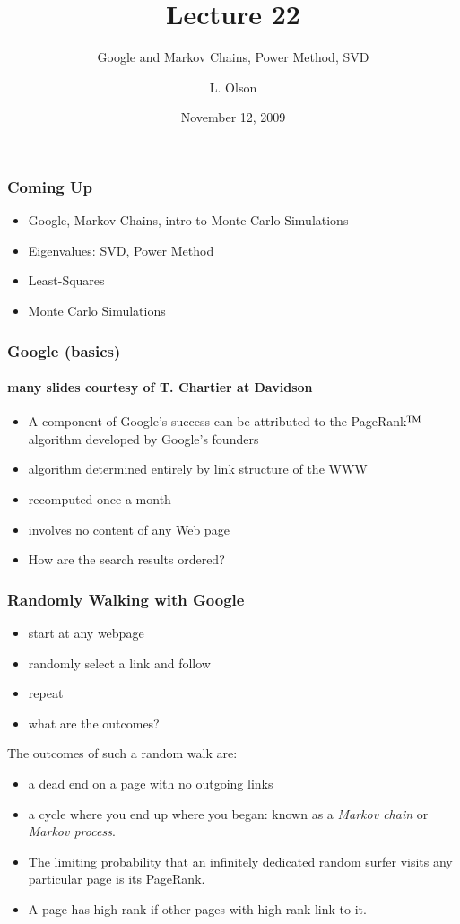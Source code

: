 \documentclass[10pt]{beamer}
\author{L. Olson}
\institute[UIUC]
{Department of Computer Science\\
University of Illinois at Urbana-Champaign\\
\vspace{0.5cm}
}
\title[CS 357]{Lecture 22}
\subtitle{Google and Markov Chains, Power Method, SVD}
\date{November 12, 2009}
\begin{document}
\begin{frame}
  \titlepage
\end{frame}
\begin{frame}
\frametitle{Coming Up}
  \begin{itemize}
    \item Google, Markov Chains, intro to Monte Carlo Simulations
    \item Eigenvalues: SVD, Power Method
    \item Least-Squares
    \item Monte Carlo Simulations
  \end{itemize}
\end{frame}
\begin{frame}
\frametitle{Google (basics)}
\framesubtitle{many slides courtesy of T. Chartier at Davidson}
\begin{itemize}
  \item A component of Google's success can be
attributed to the PageRank$^{\rm TM}$ algorithm developed by
Google's founders
  \item  algorithm determined entirely by link structure of the WWW
  \item recomputed once a month
  \item involves no content of any Web page
  \item How are the search results ordered?
\end{itemize}
\end{frame}
\begin{frame}
\frametitle{Randomly Walking with Google}

\begin{itemize}
    \item start at any webpage
    \item randomly select a link and follow
    \item repeat
    \item what are the outcomes?
\end{itemize}
\bigskip

The outcomes of such a random walk are:
\begin{itemize}
\item a dead end on a page with no outgoing links
\item a cycle where you end up where you began: known as a \emph{Markov
chain} or \emph{Markov process}.
\item The limiting probability that an infinitely dedicated random
surfer visits any particular page is its PageRank.
\item A page has high rank if other pages with high rank link to
it.
\end{itemize}
\end{frame}
\end{document}
